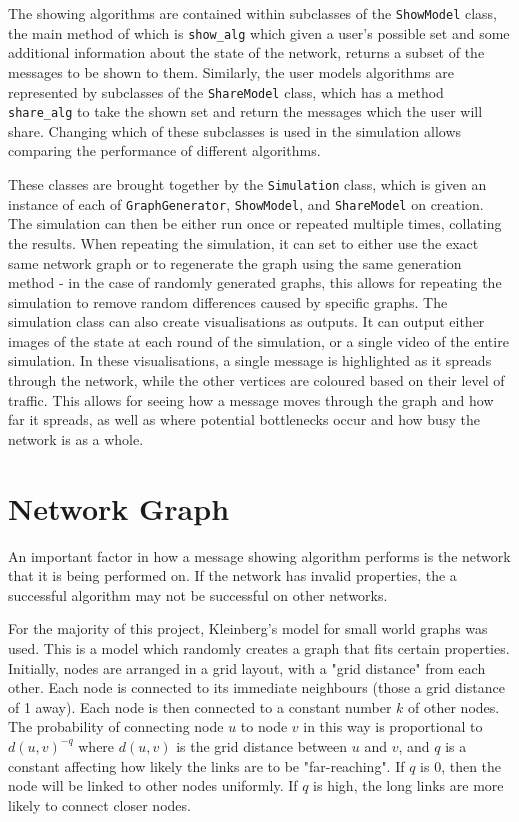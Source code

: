 \documentclass[bsc,frontabs,twoside,singlespacing,parskip,deptreport]{infthesis}     %
\begin{document}
The showing algorithms are contained within subclasses of the \texttt{ShowModel} class, the main method of which is \texttt{show\_alg} which given a user's possible set and some additional information about the state of the network, returns a subset of the messages to be shown to them. Similarly, the user models algorithms are represented by subclasses of the \texttt{ShareModel} class, which has a method \texttt{share\_alg} to take the shown set and return the messages which the user will share. Changing which of these subclasses is used in the simulation allows comparing the performance of different algorithms.

These classes are brought together by the \texttt{Simulation} class, which is given an instance of each of \texttt{GraphGenerator}, \texttt{ShowModel}, and \texttt{ShareModel} on creation. The simulation can then be either run once or repeated multiple times, collating the results. When repeating the simulation, it can set to either use the exact same network graph or to regenerate the graph using the same generation method - in the case of randomly generated graphs, this allows for repeating the simulation to remove random differences caused by specific graphs. The simulation class can also create visualisations as outputs. It can output either images of the state at each round of the simulation, or a single video of the entire simulation. In these visualisations, a single message is highlighted as it spreads through the network, while the other vertices are coloured based on their level of traffic. This allows for seeing how a message moves through the graph and how far it spreads, as well as where potential bottlenecks occur and how busy the network is as a whole.

\section{Network Graph}
An important factor in how a message showing algorithm performs is the network that it is being performed on. If the network has invalid properties, the a successful algorithm may not be successful on other networks.

For the majority of this project, Kleinberg's model for small world graphs was used\cite{Kleinberg00}. This is a model which randomly creates a graph that fits certain properties. Initially, nodes are arranged in a grid layout, with a "grid distance" from each other. Each node is connected to its immediate neighbours (those a grid distance of 1 away). Each node is then connected to a constant number $k$ of other nodes. The probability of connecting node $u$ to node $v$ in this way is proportional to $d(u, v)^{-q}$ where $d(u, v)$ is the grid distance between $u$ and $v$, and $q$ is a constant affecting how likely the links are to be "far-reaching". If $q$ is 0, then the node will be linked to other nodes uniformly. If $q$ is high, the long links are more likely to connect closer nodes.
\end{document}
